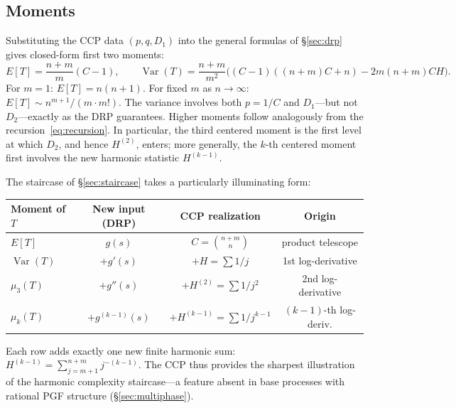 \documentclass[11pt]{article}
\theoremstyle{plain}
\theoremstyle{definition}
\theoremstyle{remark}
\DeclareMathOperator{\Var}{Var}
\begin{document}

\subsection{Moments}\label{sec:ccp-moments}

Substituting the CCP data $(p,q,D_1)$ into the general formulas of \S\ref{sec:drp} gives closed-form first two moments:
\begin{equation}\label{eq:ccp-ET}
  E[T] = \frac{n+m}{m}(C-1), \qquad
  \Var(T) = \frac{n+m}{m^2}\bigl((C-1)((n{+}m)C+n) - 2m(n{+}m)CH\bigr).
\end{equation}
For $m = 1$: $E[T] = n(n+1)$.  For fixed $m$ as $n \to \infty$: $E[T] \sim n^{m+1}/(m \cdot m!)$.  The variance involves both $p = 1/C$ and $D_1$---but not $D_2$---exactly as the DRP guarantees.  Higher moments follow analogously from the recursion~\eqref{eq:recursion}. In particular, the third centered moment is the first level at which \(D_2\), and hence \(H^{(2)}\), enters; more generally, the \(k\)-th centered moment first involves the new harmonic statistic \(H^{(k-1)}\).

The staircase of \S\ref{sec:staircase} takes a particularly illuminating form:
\begin{center}
\begin{tabular}{lccc}
\toprule
\textbf{Moment of $T$} & \textbf{New input (DRP)} & \textbf{CCP realization} & \textbf{Origin} \\
\midrule
$E[T]$ & $g(s)$ & $C = \binom{n+m}{n}$ & product telescope \\[2pt]
$\Var(T)$ & $+ g'(s)$ & $+ H = \sum 1/j$ & 1st log-derivative \\[2pt]
$\mu_3(T)$ & $+ g''(s)$ & $+ H^{(2)} = \sum 1/j^2$ & 2nd log-derivative \\[2pt]
$\mu_k(T)$ & $+ g^{(k-1)}(s)$ & $+ H^{(k-1)} = \sum 1/j^{k-1}$ & $(k{-}1)$-th log-deriv. \\
\bottomrule
\end{tabular}
\end{center}
Each row adds exactly one new finite harmonic sum: $H^{(k-1)}=\sum_{j=m+1}^{n+m} j^{-(k-1)}$. The CCP thus provides the sharpest illustration of the harmonic complexity staircase---a feature absent in base processes with rational PGF structure (\S\ref{sec:multiphase}).

\end{document}
